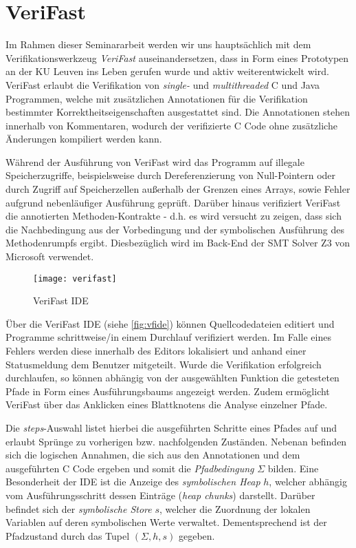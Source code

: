 \section{VeriFast}

Im Rahmen dieser Seminararbeit werden wir uns hauptsächlich mit dem Verifikationswerkzeug \emph{VeriFast} auseinandersetzen, dass in Form eines Prototypen an der KU Leuven ins Leben gerufen wurde und aktiv weiterentwickelt wird. VeriFast erlaubt die Verifikation von \emph{single-} und \emph{multithreaded} C und Java Programmen, welche mit zusätzlichen Annotationen für die Verifikation bestimmter Korrektheitseigenschaften ausgestattet sind. Die Annotationen stehen innerhalb von Kommentaren, wodurch der verifizierte C Code ohne zusätzliche Änderungen kompiliert werden kann.

Während der Ausführung von VeriFast wird das Programm auf illegale Speicherzugriffe, beispielsweise durch Dereferenzierung von Null-Pointern oder durch Zugriff auf Speicherzellen außerhalb der Grenzen eines Arrays, sowie Fehler aufgrund nebenläufiger Ausführung geprüft. Darüber hinaus verifiziert VeriFast die annotierten Methoden-Kontrakte - d.h. es wird versucht zu zeigen, dass sich die Nachbedingung aus der Vorbedingung und der symbolischen Ausführung des Methodenrumpfs ergibt. Diesbezüglich wird im Back-End der SMT Solver Z3 von Microsoft verwendet. \cite{Jacobs2010}

\begin{figure}[!hbt]
	\centering
	\texttt{[image: verifast]}
	\caption{VeriFast IDE}
	\label{fig:vfide}
\end{figure}

\noindent
Über die VeriFast IDE (siehe \vref{fig:vfide}) können Quellcodedateien editiert und Programme schrittweise/in einem Durchlauf verifiziert werden. Im Falle eines Fehlers werden diese innerhalb des Editors lokalisiert und anhand einer Statusmeldung dem Benutzer mitgeteilt. Wurde die Verifikation erfolgreich durchlaufen, so können abhängig von der ausgewählten Funktion die getesteten Pfade in Form eines Ausführungsbaums angezeigt werden. Zudem ermöglicht VeriFast über das Anklicken eines Blattknotens die Analyse einzelner Pfade.

Die \emph{steps}-Auswahl listet hierbei die ausgeführten Schritte eines Pfades auf und erlaubt Sprünge zu vorherigen bzw. nachfolgenden Zuständen. Nebenan befinden sich die logischen Annahmen, die sich aus den Annotationen und dem ausgeführten C Code ergeben und somit die \emph{Pfadbedingung} $\Sigma$ bilden. Eine Besonderheit der IDE ist die Anzeige des \emph{symbolischen Heap} $h$, welcher abhängig vom Ausführungsschritt dessen Einträge (\emph{heap chunks}) darstellt. Darüber befindet sich der \emph{symbolische Store} $s$, welcher die Zuordnung der lokalen Variablen auf deren symbolischen Werte verwaltet. Dementsprechend ist der Pfadzustand durch das Tupel $(\Sigma, h, s)$ gegeben. \cite{Jacobs2011}

